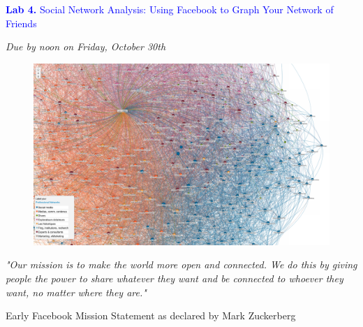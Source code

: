 \documentclass{article}
\begin{document}
\vspace*{.01mm}

\begin{center}

\Large{\textcolor{blue}{\textbf{Lab 4.}  Social Network Analysis: Using Facebook to Graph Your Network of Friends}}

\vspace{4mm}

\textit{Due by noon on Friday, October 30th}\\

\end{center}

\begin{figure}[h!]
\begin{center}
\includegraphics[width=1.55\textwidth]{visual.png}

\end{center}
\end{figure}

\setlength{\parindent}{0cm}

\large{\textit{"Our mission is to make the world more open and connected. We do this by giving people the power to share whatever they want and be connected to whoever they want, no matter where they are."}
\begin{flushright}
Early Facebook Mission Statement as declared by Mark Zuckerberg
\end{flushright}
}



\end{document}
